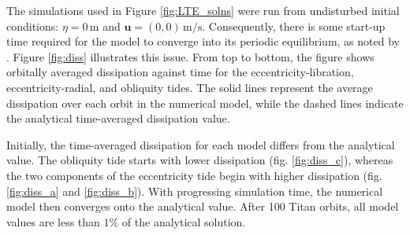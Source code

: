 The simulations used in Figure \ref{fig:LTE_solns} were run from undisturbed initial conditions: \hbox{$\eta = 0 \, \si{\metre}$} and \hbox{$\bm{u} = (0,0) \, \si{\metre\per\second}$}. Consequently, there is some start-up time required for the model to converge into its periodic equilibrium, as noted by \citet{sears1995tidal}. Figure \ref{fig:diss} illustrates this issue. From top to bottom, the figure shows orbitally averaged dissipation against time for the eccentricity-libration, eccentricity-radial, and obliquity tides.  The solid lines represent the average dissipation over each orbit in the numerical model, while the dashed lines indicate the analytical time-averaged dissipation value. 

Initially, the time-averaged dissipation for each model differs from the analytical value. The obliquity tide starts with lower dissipation (fig. \ref{fig:diss_c}), whereas the two components of the eccentricity tide begin with higher dissipation (fig. \ref{fig:diss_a} and \ref{fig:diss_b}). With progressing simulation time, the numerical model then converges onto the analytical value. After 100 Titan orbits, all model values are less than $1 \si{\percent}$ of the analytical solution. 

